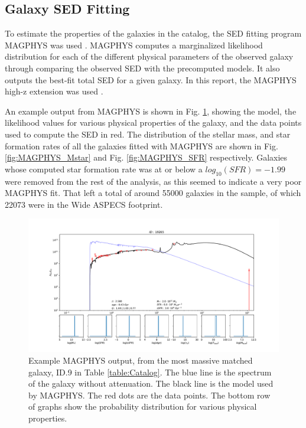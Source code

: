 


\subsection{Galaxy SED Fitting}


To estimate the properties of the galaxies in the catalog, the SED fitting program MAGPHYS was used \cite{da2008simple, da2015alma}. MAGPHYS computes a marginalized likelihood distribution for each of the different physical parameters of the observed galaxy through comparing the observed SED with the precomputed models. It also outputs the best-fit total SED for a given galaxy. In this report, the MAGPHYS high-z extension was used \cite{da2015alma}. %

An example output from MAGPHYS is shown in Fig. \ref{fig:MAGPHYS_Example}, showing the model, the likelihood values for various physical properties of the galaxy, and the data points used to compute the SED in red. The distribution of the stellar mass, and star formation rates of all the galaxies fitted with MAGPHYS are shown in Fig. \ref{fig:MAGPHYS_Mstar} and Fig. \ref{fig:MAGPHYS_SFR} respectively. Galaxies whose computed star formation rate was at or below a $log_{10}(SFR) = -1.99$ were removed from the rest of the analysis, as this seemed to indicate a very poor MAGPHYS fit. That left a total of around 55000 galaxies in the sample, of which 22073 were in the Wide ASPECS footprint.

\begin{figure}[tbp]
\centering \includegraphics[width=120mm]{19265.pdf}
\caption{Example MAGPHYS output, from the most massive matched galaxy, ID.9 in Table \ref{table:Catalog}. The blue line is the spectrum of the galaxy without attenuation. The black line is the model used by MAGPHYS. The red dots are the data points. The bottom row of graphs show the probability distribution for various physical properties.}
\label{fig:MAGPHYS_Example}
\end{figure}

